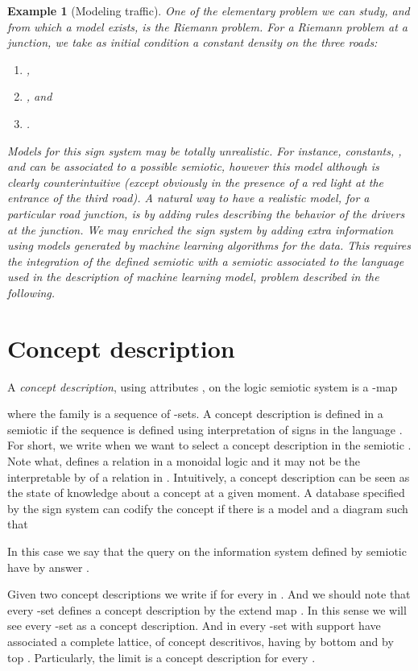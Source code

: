 \documentclass[oribibl]{llncs}
\newtheorem{exam}{Example}
\begin{document}
\begin{exam}[Modeling traffic]
One of the elementary problem we can study, and from which a model exists, is the Riemann problem. For a Riemann problem at a junction, we take as initial condition a constant density on the three roads:
\begin{enumerate}
  \item ,
  \item , and
  \item .
\end{enumerate}

Models for this sign system may be totally unrealistic. For instance, constants,  ,  and  can be associated to a possible semiotic, however this model although is clearly counterintuitive (except obviously in the presence of a red light at the entrance of the third road). A natural way to have a realistic model, for a particular road junction, is by adding rules describing the behavior of the drivers at the junction. We may enriched the sign system by adding extra information using models generated by machine learning algorithms for the data. This requires the integration of the defined semiotic with a semiotic associated to the language used in the description of machine learning model, problem described in the following.
\end{exam}



\section{Concept description}\label{Concept description}
 A \emph{concept description}, using attributes ,  on the logic semiotic system  is a -map

where the family  is a sequence of -sets. A concept description is defined in a semiotic  if the sequence  is defined using interpretation of signs in the language . For short, we write  when we  want to select a concept description in the semiotic . Note what,  defines a relation in a monoidal logic and it may not be the interpretable by  of a relation in . Intuitively, a concept description can be seen as the state of knowledge about a concept at a given moment. A database specified by the sign system  can codify the concept  if there is a model  and a diagram  such that

In this case  we say that the query  on the information system defined by semiotic  have by answer .

Given two concept descriptions  we write  if  for every  in . And we should note that every -set  defines a concept description by the extend map . In this sense we will see every -set as a concept description. And in  every -set with support  have associated a complete lattice, of concept descritivos, having by bottom  and by top . Particularly, the limit  is a concept description for every .
\end{document}
